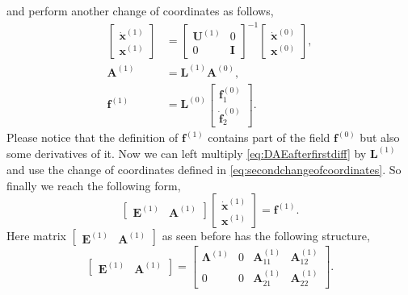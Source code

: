 		and perform another change of coordinates as follows,
		\begin{subequations}
			\label{eq:secondchangeofcoordinates}
			\begin{align*}
				\begin{bmatrix}
					\dot{\bm{x}}^{(1)} \\
					\bm{x}^{(1)} 
				\end{bmatrix}
				&=
				\begin{bmatrix}
					\bm{U}^{(1)} & 0 \\
					0 & \bm{I} 
				\end{bmatrix}^{-1}
				\begin{bmatrix}
					\dot{\bm{x}}^{(0)} \\
					\bm{x}^{(0)}
				\end{bmatrix}, \\
				\bm{A}^{(1)} 		&= \bm{L}^{(1)}\bm{A}^{(0)}, \\
				\bm{f}^{(1)} 		&= \bm{L}^{(0)}
				\begin{bmatrix}
					\bm{f}_{1}^{(0)} \\
					\dot{\bm{f}}_{2}^{(0)}
				\end{bmatrix}.
			\end{align*}
		\end{subequations}
		Please notice that the definition of $\bm{f}^{(1)}$ contains part of the field $\bm{f}^{(0)}$ but also some derivatives of it. Now we can left multiply \cref{eq:DAEafterfirstdiff} by $\bm{L}^{(1)}$  and use the change of coordinates %
		defined in \cref{eq:secondchangeofcoordinates}. So finally we reach the following form, 
		\begin{equation}
			\begin{bmatrix}
				\bm{E}^{(1)} & \bm{A}^{(1)} 
			\end{bmatrix}
			\begin{bmatrix}
				\dot{\bm{x}}^{(1)} \\
				\bm{x}^{(1)}
			\end{bmatrix} = \bm{f}^{(1)}.
		\end{equation}
		Here matrix $\begin{bmatrix}\bm{E}^{(1)} & \bm{A}^{(1)}\end{bmatrix}$ as seen before has the following structure, 
		\begin{equation}
			\begin{bmatrix}
				\bm{E}^{(1)} & \bm{A}^{(1)}
			\end{bmatrix}
			=
			\begin{bmatrix}
				\bm{\Lambda}^{(1)} 	& 0 & \bm{A}_{11}^{(1)} & \bm{A}_{12}^{(1)}  \\
				0 					& 0 & \bm{A}_{21}^{(1)} & \bm{A}_{22}^{(1)}
			\end{bmatrix}.
		\end{equation}
